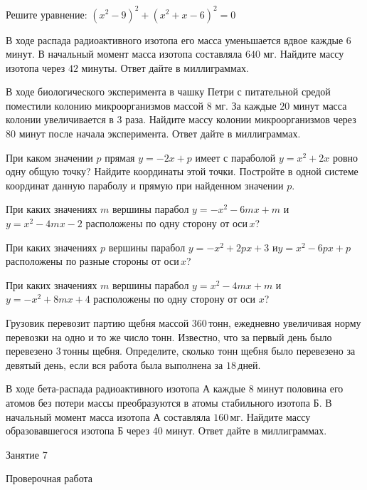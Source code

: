 \begin{class}[number=6]
	\begin{listofex}
		\item Решите уравнение: \quad \( (x^2-9)^2+(x^2+x-6)^2=0 \)
		\item В ходе распада радиоактивного изотопа его масса уменьшается вдвое каждые \( 6 \) минут. В начальный момент масса изотопа составляла \( 640 \) мг. Найдите массу изотопа через \( 42 \) минуты. Ответ дайте в миллиграммах.
		\item В ходе биологического эксперимента в чашку Петри с питательной средой поместили колонию микроорганизмов массой \( 8 \) мг. За каждые \( 20 \) минут масса колонии увеличивается в \( 3 \) раза. Найдите массу колонии микроорганизмов через \( 80 \) минут после начала эксперимента. Ответ дайте в миллиграммах.
		\item При каком значении \( p \) прямая \( y=-2x+p \) имеет с параболой \( y=x^2+2x \) ровно одну общую точку? Найдите координаты этой точки. Постройте в одной системе координат данную параболу и прямую при найденном значении \( p \).
		\item При каких значениях \( m \) вершины парабол \( y =-x^2-6mx+m \) и \( y= x^2-4mx-2 \) расположены по одну сторону от оси \( x \)?		
		\item При каких значениях \( p \) вершины парабол \( y= -x^2+2px+3 \) и\( y= x^2-6px+p \) расположены по разные стороны от оси \( x \)?
	\end{listofex}
\end{class}

\begin{homework}[number=3]
	\begin{listofex}
		\item При каких значениях \( m \) вершины парабол \( y= x^2-4mx+m \) и \(y=-x^2+8mx+4 \) расположены по одну сторону от оси \( x \)?
		\item Грузовик перевозит партию щебня массой \( 360 \) тонн, ежедневно увеличивая норму перевозки на одно и то же число тонн. Известно, что за первый день было перевезено \( 3 \) тонны щебня. Определите, сколько тонн щебня было перевезено за девятый день, если вся работа была выполнена за \( 18 \) дней.
		\item В ходе бета-распада радиоактивного изотопа А каждые \( 8 \) минут половина его атомов без потери массы преобразуются в атомы стабильного изотопа Б. В начальный момент масса изотопа А составляла \( 160 \) мг. Найдите массу образовавшегося изотопа Б через \( 40 \) минут. Ответ дайте в миллиграммах.
	\end{listofex}
\end{homework}

\begin{class}[number=7]
	\begin{listofex}
		\item Занятие 7
	\end{listofex}
\end{class}

\begin{exam}
	\begin{listofex}
		\item Проверочная работа
	\end{listofex}
\end{exam}
